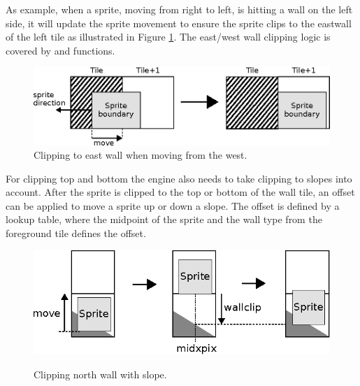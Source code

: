 \documentclass[book.tex]{subfiles}
\begin{document}
\par
As example, when a sprite, moving from right to left, is hitting a wall on the left side, it will update the sprite movement to ensure the sprite clips to the eastwall of the left tile as illustrated in Figure \ref{fig:clipping_east}. The east/west wall clipping logic is covered by  and  functions. \\

\begin{figure}[H]
  \centering
  \includegraphics[width=\textwidth]{imgs/drawings/clipping_east.eps}
  \caption{Clipping to east wall when moving from the west.}
  \label{fig:clipping_east}  
\end{figure}

\par
\begin{minipage}{\textwidth}
  
\end{minipage}
\label{wallclip_array}
\par
For clipping top and bottom the engine also needs to take clipping to slopes into account. After the sprite is clipped to the top or bottom of the wall tile, an offset can be applied to move a sprite up or down a slope. The offset is defined by a lookup table, where the midpoint of the sprite and the wall type from the foreground tile defines the offset.

\begin{figure}[H]
  \centering
  \includegraphics[width=\textwidth]{imgs/drawings/clipping_north.eps}
  \label{fig:clipping_north}
  \caption{Clipping north wall with slope.}
\end{figure}
\end{document}
